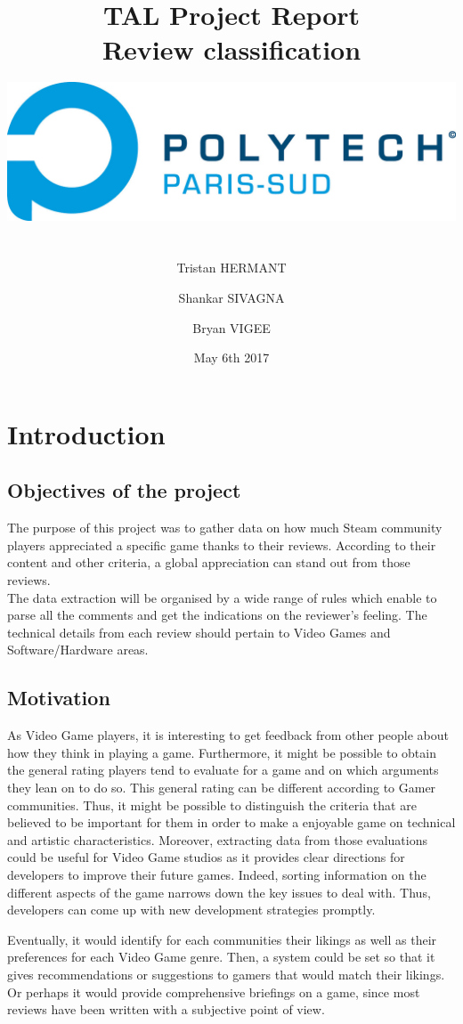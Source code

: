 \documentclass[paper=a4,fontsize=12pt]{report}
\title{ \LARGE \textbf{TAL Project Report
\\Review classification} \\
\includegraphics[width=15cm,height=5cm]{POLYTECH_PARIS-SUD_RVB.jpg}}
\author{\large Tristan HERMANT
\and
Shankar SIVAGNA
\and
Bryan VIGEE}
\date{May 6th 2017}
\begin{document}
\maketitle

\tableofcontents
\setcounter{page}{1}
\chapter{Introduction}
\section{Objectives of the project}
	The purpose of this project was to gather data on how much Steam community players appreciated a specific game thanks to their reviews. According to their content and other criteria, a global appreciation can stand out from those reviews. \\ \linebreak
The data extraction will be organised by a wide range of rules which enable to parse all the comments and get the indications on the reviewer's feeling. The technical details from each review should pertain to Video Games and Software/Hardware areas. 

	
\section{Motivation}
	As Video Game players, it is interesting to get feedback from other people about how they think in playing a game. Furthermore, it might be possible to obtain the general rating players tend to evaluate for a game and on which arguments they lean on to do so.  This general rating can be different according to Gamer communities. Thus, it might be possible to distinguish the criteria that are believed to be important for them in order to make a enjoyable game on technical and artistic characteristics.
\linebreak \linebreak
	Moreover, extracting data from those evaluations could be useful for Video Game studios as it provides clear directions for developers to improve their future games. Indeed, sorting information on the different aspects of the game narrows down the key issues to deal with. Thus, developers  can come up with new development strategies promptly.

Eventually, it would identify for each communities their likings as well as their preferences for each Video Game genre.  Then, a system could be set so that it gives recommendations or suggestions to gamers that would match their likings. Or perhaps it would provide comprehensive briefings on a game, since most reviews have been written with a subjective point of view.\linebreak 
\end{document}
